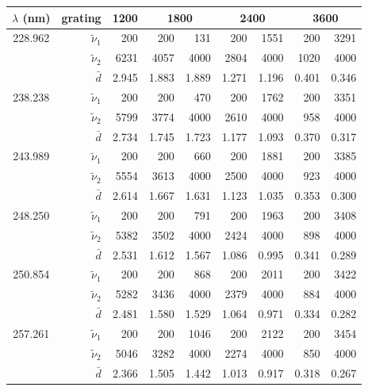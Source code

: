 \begin{tabular}{crrrrrrrr}
\toprule
$\lambda$ (nm)
	& grating & 1200 & \multicolumn{2}{c}{1800}
		& \multicolumn{2}{c}{2400} & \multicolumn{2}{c}{3600} \\
\midrule
\multirow{3}{*}{228.962}
	& $\tilde{\nu}_1$ &   200 &   200 &   131 &   200 &  1551 &   200 &  3291 \\
	& $\tilde{\nu}_2$ &  6231 &  4057 &  4000 &  2804 &  4000 &  1020 &  4000 \\
	& $\bar{d}$       & 2.945 & 1.883 & 1.889 & 1.271 & 1.196 & 0.401 & 0.346 \\
\midrule
\multirow{3}{*}{238.238}
	& $\tilde{\nu}_1$ &   200 &   200 &   470 &   200 &  1762 &   200 &  3351 \\
	& $\tilde{\nu}_2$ &  5799 &  3774 &  4000 &  2610 &  4000 &   958 &  4000 \\
	& $\bar{d}$       & 2.734 & 1.745 & 1.723 & 1.177 & 1.093 & 0.370 & 0.317 \\
\midrule
\multirow{3}{*}{243.989}
	& $\tilde{\nu}_1$ &   200 &   200 &   660 &   200 &  1881 &   200 &  3385 \\
	& $\tilde{\nu}_2$ &  5554 &  3613 &  4000 &  2500 &  4000 &   923 &  4000 \\
	& $\bar{d}$       & 2.614 & 1.667 & 1.631 & 1.123 & 1.035 & 0.353 & 0.300 \\
\midrule
\multirow{3}{*}{248.250}
	& $\tilde{\nu}_1$ &   200 &   200 &   791 &   200 &  1963 &   200 &  3408 \\
	& $\tilde{\nu}_2$ &  5382 &  3502 &  4000 &  2424 &  4000 &   898 &  4000 \\
	& $\bar{d}$       & 2.531 & 1.612 & 1.567 & 1.086 & 0.995 & 0.341 & 0.289 \\
\midrule
\multirow{3}{*}{250.854}
	& $\tilde{\nu}_1$ &   200 &   200 &   868 &   200 &  2011 &   200 &  3422 \\
	& $\tilde{\nu}_2$ &  5282 &  3436 &  4000 &  2379 &  4000 &   884 &  4000 \\
	& $\bar{d}$       & 2.481 & 1.580 & 1.529 & 1.064 & 0.971 & 0.334 & 0.282 \\
\midrule
\multirow{3}{*}{257.261}
	& $\tilde{\nu}_1$ &   200 &   200 &  1046 &   200 &  2122 &   200 &  3454 \\
	& $\tilde{\nu}_2$ &  5046 &  3282 &  4000 &  2274 &  4000 &   850 &  4000 \\
	& $\bar{d}$       & 2.366 & 1.505 & 1.442 & 1.013 & 0.917 & 0.318 & 0.267 \\
\bottomrule
\end{tabular}
